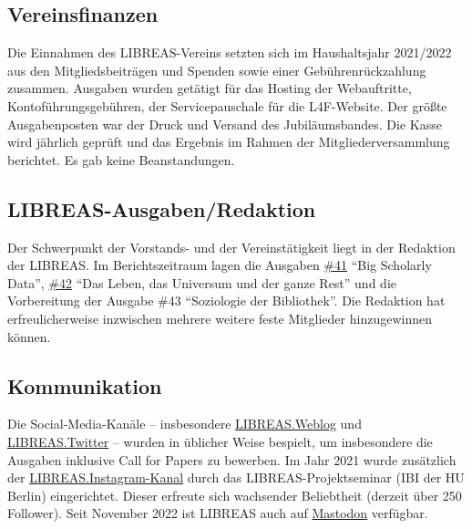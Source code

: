 \documentclass[a4paper,
fontsize=11pt,
oneside,
numbers=noperiodatend,
parskip=half-,
bibliography=totoc,
final
]{scrartcl}
\begin{document}
\hypertarget{vereinsfinanzen}{%
\subsection{Vereinsfinanzen}\label{vereinsfinanzen}}

Die Einnahmen des LIBREAS-Vereins setzten sich im Haushaltsjahr
2021/2022 aus den Mitgliedsbeiträgen und Spenden sowie einer
Gebührenrückzahlung zusammen. Ausgaben wurden getätigt für das Hosting
der Webauftritte, Kontoführungsgebühren, der Servicepauschale für die
L4F-Website. Der größte Ausgabenposten war der Druck und Versand des
Jubiläumsbandes. Die Kasse wird jährlich geprüft und das Ergebnis im
Rahmen der Mitgliederversammlung berichtet. Es gab keine Beanstandungen.

\hypertarget{libreas-ausgabenredaktion}{%
\subsection{LIBREAS-Ausgaben/Redaktion}\label{libreas-ausgabenredaktion}}

Der Schwerpunkt der Vorstands- und der Vereinstätigkeit liegt in der
Redaktion der LIBREAS. Im Berichtszeitraum lagen die Ausgaben
\href{https://libreas.eu/ausgabe41/inhalt/}{\#41} \enquote{Big Scholarly
Data}, \href{https://libreas.eu/ausgabe42/inhalt/}{\#42} \enquote{Das
Leben, das Universum und der ganze Rest} und die Vorbereitung der
Ausgabe \#43 \enquote{Soziologie der Bibliothek}. Die Redaktion hat
erfreulicherweise inzwischen mehrere weitere feste Mitglieder
hinzugewinnen können.

\hypertarget{kommunikation}{%
\subsection{Kommunikation}\label{kommunikation}}

Die Social-Media-Kanäle -- insbesondere
\href{https://libreas.wordpress.com/}{LIBREAS.Weblog} und
\href{https://twitter.com/libreas}{LIBREAS.Twitter} -- wurden in
üblicher Weise bespielt, um insbesondere die Ausgaben inklusive Call for
Papers zu bewerben. Im Jahr 2021 wurde zusätzlich der
\href{https://www.instagram.com/libreas.libraryideas/}{LIBREAS.Instagram-Kanal}
durch das LIBREAS-Projektseminar (IBI der HU Berlin) eingerichtet.
Dieser erfreute sich wachsender Beliebtheit (derzeit über 250 Follower).
Seit November 2022 ist LIBREAS auch auf
\href{https://berlin.social/@libreas@openbiblio.social}{Mastodon}
verfügbar.
\end{document}
